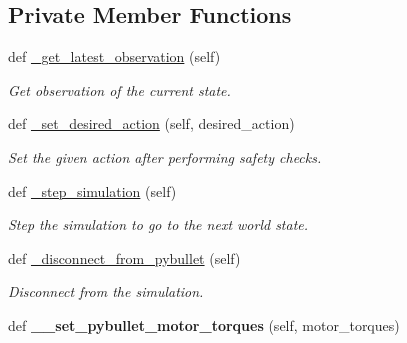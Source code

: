 \subsection*{Private Member Functions}
\begin{DoxyCompactItemize}
\item 
def \hyperlink{classtrifinger__simulation_1_1sim__finger_1_1SimFinger_afa4a964d02c90e36da1adae854f79b2e}{\+\_\+get\+\_\+latest\+\_\+observation} (self)
\begin{DoxyCompactList}\small\item\em Get observation of the current state. \end{DoxyCompactList}\item 
def \hyperlink{classtrifinger__simulation_1_1sim__finger_1_1SimFinger_a05f4dff6e5d524a8c86f27bc76f2199e}{\+\_\+set\+\_\+desired\+\_\+action} (self, desired\+\_\+action)
\begin{DoxyCompactList}\small\item\em Set the given action after performing safety checks. \end{DoxyCompactList}\item 
\mbox{\label{classtrifinger__simulation_1_1sim__finger_1_1SimFinger_a2c7322d4a75101b6947c8b6d3004e3b5}} 
def \hyperlink{classtrifinger__simulation_1_1sim__finger_1_1SimFinger_a2c7322d4a75101b6947c8b6d3004e3b5}{\+\_\+step\+\_\+simulation} (self)
\begin{DoxyCompactList}\small\item\em Step the simulation to go to the next world state. \end{DoxyCompactList}\item 
def \hyperlink{classtrifinger__simulation_1_1sim__finger_1_1SimFinger_a946035313313f8068a568360f53cfa48}{\+\_\+disconnect\+\_\+from\+\_\+pybullet} (self)
\begin{DoxyCompactList}\small\item\em Disconnect from the simulation. \end{DoxyCompactList}\item 
\mbox{\label{classtrifinger__simulation_1_1sim__finger_1_1SimFinger_a9fbb93e4c2ad2f6f22786b4930fb1ceb}} 
def {\bfseries \+\_\+\+\_\+set\+\_\+pybullet\+\_\+motor\+\_\+torques} (self, motor\+\_\+torques)
\item 
\mbox{\label{classtrifinger__simulation_1_1sim__finger_1_1SimFinger_a5ced4773d25b0160f8ae503c97647348}} 

\end{DoxyCompactItemize}
